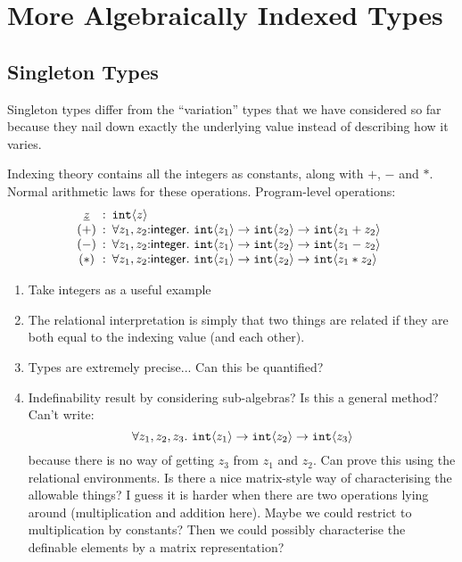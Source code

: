 \section{More Algebraically Indexed Types}
\label{sec:further-examples}

\subsection{Singleton Types}
\label{sec:singleton-types}

Singleton types differ from the ``variation'' types that we have
considered so far because they nail down exactly the underlying value
instead of describing how it varies.

Indexing theory contains all the integers as constants, along with
$+$, $-$ and $*$. Normal arithmetic laws for these
operations. Program-level operations:
\begin{displaymath}
  \begin{array}{@{}c@{\hspace{0.5em}:\hspace{0.5em}}l}
    \underline{z} & \tyPrim{int}{z} \\ %
    (+) & \forall z_1,z_2\mathord:\mathsf{integer}.\ \tyPrim{int}{z_1} \to \tyPrim{int}{z_2} \to \tyPrim{int}{z_1 + z_2} \\
    (-) & \forall z_1,z_2\mathord:\mathsf{integer}.\ \tyPrim{int}{z_1} \to \tyPrim{int}{z_2} \to \tyPrim{int}{z_1 - z_2} \\
    (*) & \forall z_1,z_2\mathord:\mathsf{integer}.\ \tyPrim{int}{z_1} \to \tyPrim{int}{z_2} \to \tyPrim{int}{z_1 * z_2}
  \end{array}
\end{displaymath}

\begin{enumerate}
\item Take integers as a useful example
\item The relational interpretation is simply that two things are
  related if they are both equal to the indexing value (and each
  other).
\item Types are extremely precise... Can this be quantified?
\item Indefinability result by considering sub-algebras? Is this a
  general method? Can't write:
  \begin{displaymath}
    \forall z_1,z_2,z_3.\ \textup{\texttt{int}}\langle z_1 \rangle \to \textup{\texttt{int}}\langle z_2 \rangle \to \textup{\texttt{int}}\langle z_3 \rangle
  \end{displaymath}
  because there is no way of getting $z_3$ from $z_1$ and $z_2$. Can
  prove this using the relational environments. Is there a nice
  matrix-style way of characterising the allowable things? I guess it
  is harder when there are two operations lying around (multiplication
  and addition here). Maybe we could restrict to multiplication by
  constants? Then we could possibly characterise the definable
  elements by a matrix representation?
\end{enumerate}

